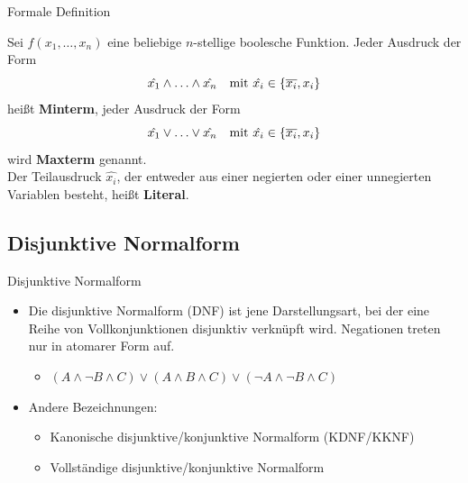 \documentclass[12pt%
,xcolor=table
,aspectratio=169%
]{beamer}
\begin{document}
\begin{frame}{Formale Definition}
\begin{definition}
Sei $f(x_1 ,\ldots , x_n)$ eine beliebige $n$-stellige boolesche Funktion. Jeder Ausdruck der Form
$$
	\hat{x_1} \land \ldots \land \hat{x_n} \text{\quad mit } \hat{x_i} \in \{\overline{x_i}, x_i\} 
$$
heißt \textbf{Minterm}, jeder Ausdruck der Form
$$
	\hat{x_1} \lor \ldots \lor \hat{x_n} \text{\quad mit } \hat{x_i} \in \{\overline{x_i}, x_i\} 
$$
wird \textbf{Maxterm} genannt.\\
Der Teilausdruck $\hat{x_i}$, der entweder aus einer negierten oder einer unnegierten Variablen besteht, heißt \textbf{Literal}.
\end{definition}
\end{frame}

\subsection{Disjunktive Normalform}
\begin{frame}{Disjunktive Normalform}
\begin{itemize}
	\item Die disjunktive Normalform (DNF) ist jene Darstellungsart, bei der eine Reihe von Vollkonjunktionen disjunktiv verknüpft wird. Negationen  treten nur in atomarer Form auf.
	\begin{itemize}
		\item $(A \land \neg B \land C) \lor (A \land B \land C) \lor (\neg A \land \neg B \land C)$ 
	\end{itemize}
	\item Andere Bezeichnungen:
	\begin{itemize}
		\item Kanonische disjunktive/konjunktive Normalform (KDNF/KKNF)
		\item Vollständige disjunktive/konjunktive Normalform
	\end{itemize}
\end{itemize}
\end{frame}
\end{document}

